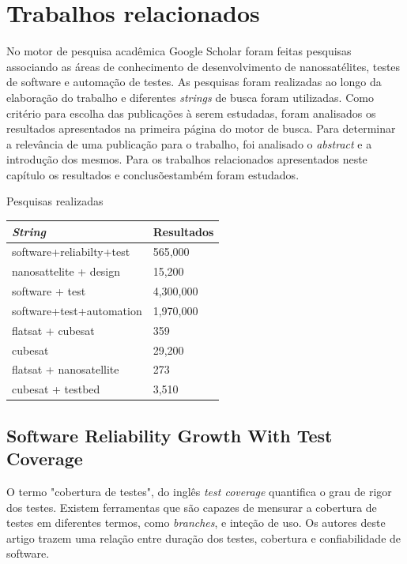 \chapter{Trabalhos relacionados}
\label{chapter:relacionados}

No motor de pesquisa acadêmica Google Scholar foram feitas pesquisas associando as áreas de conhecimento de desenvolvimento de nanossatélites, testes de software e automação de testes. As pesquisas foram realizadas ao longo da elaboração do trabalho e diferentes \textit{strings} de busca foram utilizadas. Como critério para escolha das publicações à serem estudadas, foram analisados os resultados apresentados na primeira página do motor de busca. Para determinar a relevância de uma publicação para o trabalho, foi analisado o \textit{abstract} e a introdução dos mesmos. Para os trabalhos relacionados apresentados neste capítulo os resultados e conclusõestambém foram estudados.


\begin{quadro}[h!]
\caption{Pesquisas realizadas}
\begin{tabular}{|l|l|}
\hline
\textit{String}          & Resultados \\ \hline
software+reliabilty+test & 565,000    \\
nanosattelite + design   & 15,200     \\
software + test          & 4,300,000  \\
software+test+automation & 1,970,000  \\
flatsat + cubesat        & 359        \\
cubesat                  & 29,200     \\
flatsat + nanosatellite  & 273        \\
cubesat + testbed        & 3,510      \\ \hline
\end{tabular}
 \label{quadro:pesquisas}
\end{quadro}

\section{Software Reliability Growth With Test Coverage \texorpdfstring{\cite{malaiya-2002}}{} }
\label{relacionados:malaiya-2002}
O termo "cobertura de testes", do inglês \textit{test coverage} quantifica o grau de rigor dos testes. Existem ferramentas que são capazes de mensurar a cobertura de testes em diferentes termos, como \textit{branches}, e inteção de uso. Os autores deste artigo trazem uma relação entre duração dos testes, cobertura e confiabilidade de software.

